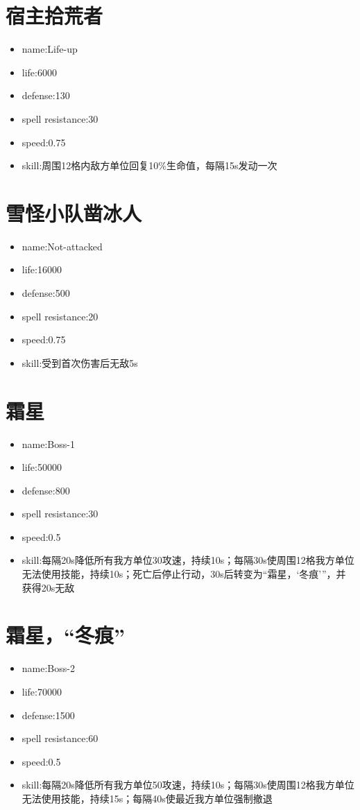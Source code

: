 \documentclass[a4paper,12pt]{article}
\begin{document}
	\section{宿主拾荒者}
		\begin{itemize}
			\item name:Life-up
			\item life:6000
			\item defense:130
			\item spell resistance:30
			\item speed:0.75
			\item skill:周围12格内敌方单位回复10$\%$生命值，每隔15s发动一次
		\end{itemize}
	\section{雪怪小队凿冰人}
		\begin{itemize}
			\item name:Not-attacked
			\item life:16000
			\item defense:500
			\item spell resistance:20
			\item speed:0.75
			\item skill:受到首次伤害后无敌5s
		\end{itemize}
	\section{霜星}
		\begin{itemize}
			\item name:Boss-1
			\item life:50000
			\item defense:800
			\item spell resistance:30
			\item speed:0.5
			\item skill:每隔20s降低所有我方单位30攻速，持续10s；每隔30s使周围12格我方单位无法使用技能，持续10s；死亡后停止行动，30s后转变为“霜星，‘冬痕’”，并获得20s无敌
		\end{itemize}
	\section{霜星，“冬痕”}
		\begin{itemize}
			\item name:Boss-2
			\item life:70000
			\item defense:1500
			\item spell resistance:60
			\item speed:0.5
			\item skill:每隔20s降低所有我方单位50攻速，持续10s；每隔30s使周围12格我方单位无法使用技能，持续15s；每隔40s使最近我方单位强制撤退
		\end{itemize}
\end{document}
